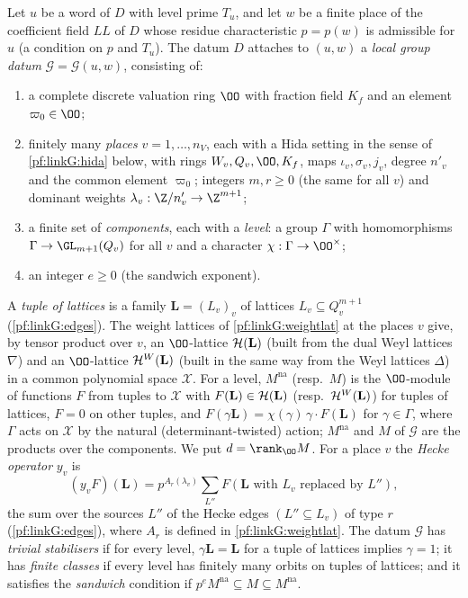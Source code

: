\begin{definition}\label{pf:linkG:gatp}
Let $u$ be a word of $D$ with level prime $T_u$, and let $w$ be a finite place of the coefficient field
$\mathit{LL}$ of $D$ whose residue characteristic $p=p(w)$ is admissible for $u$ (a condition on
$p$ and $T_u$). The datum $D$ attaches to $(u,w)$ a \emph{local group datum} $\mathcal G=\mathcal G(u,w)$,
consisting of:
\begin{enumerate}[label=(\alph*)]
\item a complete discrete valuation ring $\OO$ with fraction field $K_f$ and an element $\varpi_0\in\OO$;
\item finitely many \emph{places} $v=1,\dots,n_V$, each with a Hida setting in the sense of \cref{pf:linkG:hida}
below, with rings $W_v,Q_v,\OO,K_f$, maps $\iota_v,\sigma_v,j_v$, degree $n'_v$ and the common element $\varpi_0$;
integers $m,r\ge0$ (the same for all $v$) and dominant weights $\lambda_v:\Z/n'_v\to\Z^{m+1}$;
\item a finite set of \emph{components}, each with a \emph{level}: a group $\Gamma$ with homomorphisms
$\Gamma\to\GL_{m+1}(Q_v)$ for all $v$ and a character $\chi:\Gamma\to\OO^\times$;
\item an integer $e\ge0$ (the sandwich exponent).
\end{enumerate}
A \emph{tuple of lattices} is a family $\mathbf L=(L_v)_v$ of lattices $L_v\subseteq Q_v^{m+1}$ (\cref{pf:linkG:edges}).
The weight lattices of \cref{pf:linkG:weightlat} at the places $v$ give, by tensor product over $v$, an
$\OO$-lattice $\mathcal H(\mathbf L)$ (built from the dual Weyl lattices $\nabla$) and an $\OO$-lattice
$\mathcal H^{W}(\mathbf L)$ (built in the same way from the Weyl lattices $\Delta$) in a common polynomial space $\mathcal X$.
For a level, $M^{\mathrm{na}}$ (resp.\ $M$) is the $\OO$-module of functions $F$ from tuples to $\mathcal X$ with
$F(\mathbf L)\in\mathcal H(\mathbf L)$ (resp.\ $\mathcal H^{W}(\mathbf L)$) for tuples of lattices, $F=0$ on other tuples, and
$F(\gamma\mathbf L)=\chi(\gamma)\,\gamma\cdot F(\mathbf L)$ for $\gamma\in\Gamma$, where $\Gamma$ acts on $\mathcal X$ by the
natural (determinant-twisted) action; $M^{\mathrm{na}}$ and $M$ of $\mathcal G$ are the products over the
components. We put $d=\rank_\OO M$. For a place $v$ the \emph{Hecke operator} $y_v$ is
\[
(y_vF)(\mathbf L)=p^{A_r(\lambda_v)}\sum_{L''}F(\mathbf L\text{ with }L_v\text{ replaced by }L''),
\]
the sum over the sources $L''$ of the Hecke edges $(L''\subseteq L_v)$ of type $r$ (\cref{pf:linkG:edges}), where
$A_r$ is defined in \cref{pf:linkG:weightlat}. The datum $\mathcal G$ has \emph{trivial stabilisers} if for every
level, $\gamma\mathbf L=\mathbf L$ for a tuple of lattices implies $\gamma=1$; it has \emph{finite classes} if every
level has finitely many orbits on tuples of lattices; and it satisfies the \emph{sandwich} condition if
$p^eM^{\mathrm{na}}\subseteq M\subseteq M^{\mathrm{na}}$.
\end{definition}

